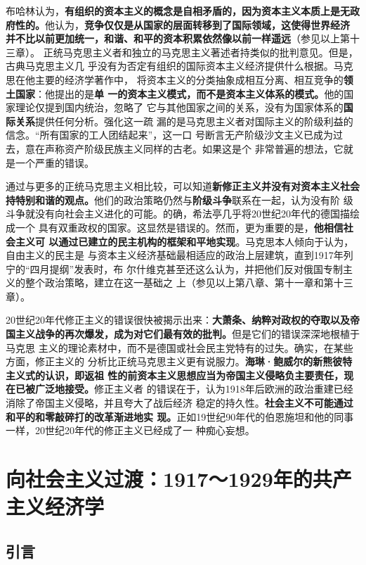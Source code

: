 布哈林认为，\textbf{有组织的资本主义的概念是自相矛盾的，因为资本主义本质上是无政
  府性的。}他认为，\textbf{竞争仅仅是从国家的层面转移到了国际领域，这使得世界经济
  并不比以前更加统一，和谐、和平的资本积累依然像以前一样遥远}（参见以上第十三章）。
正统马克思主义者和独立的马克思主义著述者持类似的批判意见。但是，古典马克思主义几
乎没有为否定有组织的国际资本主义经济提供什么根据。马克思在他主要的经济学著作中，
将资本主义的分类抽象成相互分离、相互竞争的\textbf{领土国家}：他提出的是\textbf{单
  一的资本主义模式，而不是资本主义体系的模式。}他的国家理论仅提到国内统治，忽略了
它与其他国家之间的关系，没有为国家体系的\textbf{国际关系}提供任何分析。强化这一疏
漏的是马克思主义者对国际主义的阶级利益的信念。“所有国家的工人团结起来”，这一口
号断言无产阶级沙文主义已成为过去，意在声称资产阶级民族主义同样的古老。如果这是个
非常普遍的想法，它就是一个严重的错误。

通过与更多的正统马克思主义相比较，可以知道\textbf{新修正主义并没有对资本主义社会
  持特别和谐的观点。}他们的政治策略仍然与\textbf{阶级斗争}联系在一起，认为没有阶
级斗争就没有向社会主义进化的可能。的确，希法亭几乎将20世纪20年代的德国描绘成一个
具有双重政权的国家。这显然是错误的。然而，更为重要的是，\textbf{他相信社会主义可
  以通过已建立的民主机构的框架和平地实现}。马克思本人倾向于认为，自由主义的民主是
与资本主义经济基础最相适应的政治上层建筑，直到1917年列宁的“四月提纲”发表时，布
尔什维克甚至还这么认为，并把他们反对俄国专制主义的整个政治策略，建立在这一基础之
上（参见以上第八章、第十一章和第十三章）。

20世纪20年代修正主义的错误很快被揭示出来：\textbf{大萧条、纳粹对政权的夺取以及帝
  国主义战争的再次爆发，成为对它们最有效的批判。}但是它们的错误深深地根植于马克思
主义的理论素材中，而不是德国或社会民主党特有的过失。确实，在某些方面，修正主义的
分析比正统马克思主义更有说服力。\textbf{海琳·鲍威尔的新熊彼特主义式的认识，即返祖
  性的前资本主义思想应当为帝国主义侵略负主要责任，现在已被广泛地接受。}修正主义者
的错误在于，认为1918年后欧洲的政治重建已经消除了帝国主义侵略，并且夸大了战后经济
稳定的持久性。\textbf{社会主义不可能通过和平的和零敲碎打的改革渐进地实
  现。}正如19世纪90年代的伯恩施坦和他的同事一样，20世纪20年代的修正主义已经成了一
种痴心妄想。

\chapter{向社会主义过渡：1917～1929年的共产主义经济学}

\section{引言}

